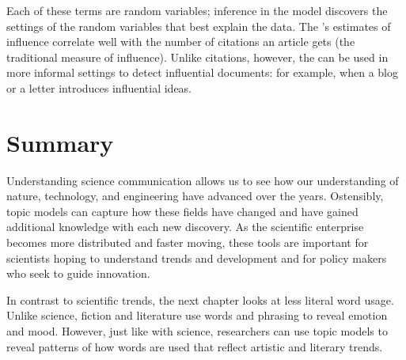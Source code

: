 Each of these terms are random variables; inference in the model discovers the
settings of the random variables that best explain the data.  The 's
estimates of influence correlate well with the number of citations an article
gets (the traditional measure of influence).  Unlike citations, however, the
 can be used in more informal settings to detect influential
documents: for example, when a blog or a letter introduces influential
ideas.

\section{Summary}

Understanding science communication allows us to see how our
understanding of nature, technology, and engineering have advanced
over the years.
Ostensibly, topic models can capture how these fields have changed and
have gained additional knowledge with each new discovery.
As the scientific enterprise becomes more distributed and faster
moving, these tools are important for scientists hoping to understand
trends and development and for policy makers who seek to guide
innovation.

In contrast to scientific trends, the next chapter looks at less
literal word usage.
Unlike science, fiction and literature use words and phrasing to
reveal emotion and mood.
However, just like with science, researchers can use topic models to reveal patterns of how words are used
that reflect artistic and literary trends.
